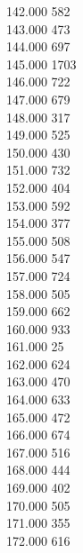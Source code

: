 { 142.000	582 \\
 143.000	473 \\
 144.000	697 \\
 145.000	1703 \\
 146.000	722 \\
 147.000	679 \\
 148.000	317 \\
 149.000	525 \\
 150.000	430 \\
 151.000	732 \\
 152.000	404 \\
 153.000	592 \\
 154.000	377 \\
 155.000	508 \\
 156.000	547 \\
 157.000	724 \\
 158.000	505 \\
 159.000	662 \\
 160.000	933 \\
 161.000	25 \\
 162.000	624 \\
 163.000	470 \\
 164.000	633 \\
 165.000	472 \\
 166.000	674 \\
 167.000	516 \\
 168.000	444 \\
 169.000	402 \\
 170.000	505 \\
 171.000	355 \\
 172.000	616 \\
}
